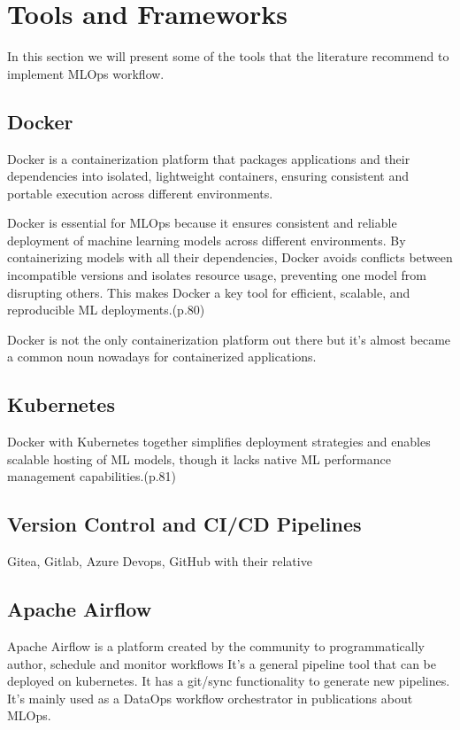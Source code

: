 \section{Tools and Frameworks}\label{sec:tools}

In this section we will present some of the tools that the literature recommend to implement MLOps workflow.

\subsection{Docker}\label{subsec:docker}
Docker\cite{docker} is a containerization platform that packages applications and their dependencies into isolated,
lightweight containers, ensuring consistent and portable execution across different environments.

Docker is essential for MLOps because it ensures consistent and reliable deployment of machine learning models across different environments.
By containerizing models with all their dependencies, Docker avoids conflicts between incompatible versions and isolates resource usage,
preventing one model from disrupting others.
This makes Docker a key tool for efficient, scalable, and reproducible ML deployments.\cite{treveil2020introducing}(p.80)

Docker is not the only containerization platform out there but it's almost became a common noun nowadays for containerized applications.

\subsection{Kubernetes}\label{subsec:kubernetes2}

Docker with Kubernetes together simplifies deployment strategies and enables scalable hosting of ML models,
though it lacks native ML performance management capabilities.\cite{treveil2020introducing}(p.81)

\subsection{Version Control and CI/CD Pipelines}\label{subsec:version-control-and-ci/cd-pipelines}
Gitea, Gitlab, Azure Devops, GitHub with their relative

\subsection{Apache Airflow}
Apache Airflow\cite{airflow} is a platform created by the community to programmatically author, schedule and monitor workflows\cite{airflow}
It's a general pipeline tool that can be deployed on kubernetes.
It has a git/sync functionality to generate new pipelines.
It's mainly used as a DataOps workflow orchestrator in publications about MLOps.

